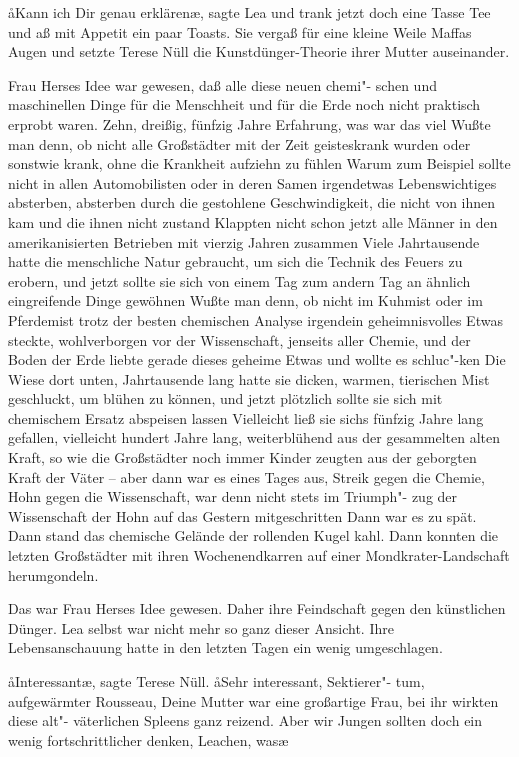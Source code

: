 \aa{}Kann ich Dir genau erklären\ae{}, sagte Lea und trank jetzt doch
eine Tasse Tee und aß mit Appetit ein paar Toasts. Sie
vergaß für eine kleine Weile Maffas Augen und setzte Terese
Nüll die Kunstdünger-Theorie ihrer Mutter auseinander.

Frau Herses Idee war gewesen, daß alle diese neuen chemi"-%
schen und maschinellen Dinge für die Menschheit und für die
Erde noch nicht praktisch erprobt waren. Zehn, dreißig, fünfzig
Jahre Erfahrung, was war das viel\frag{} Wußte man denn, ob
nicht alle Großstädter mit der Zeit geisteskrank wurden oder
sonstwie krank, ohne die Krankheit aufziehn zu fühlen\frag{}
Warum zum Beispiel sollte nicht in allen Automobilisten oder
in deren Samen irgendetwas Lebenswichtiges absterben,
absterben durch die gestohlene Geschwindigkeit, die nicht von
ihnen kam und die ihnen nicht zustand\frag{} Klappten nicht schon
jetzt alle Männer in den amerikanisierten Betrieben mit
vierzig Jahren zusammen\frag{} Viele Jahrtausende hatte die
menschliche Natur gebraucht, um sich die Technik des Feuers
zu erobern, und jetzt sollte sie sich von einem Tag zum andern
Tag an ähnlich eingreifende Dinge gewöhnen\frag{} Wußte man
denn, ob nicht im Kuhmist oder im Pferdemist trotz der besten
chemischen Analyse irgendein geheimnisvolles Etwas steckte,
wohlverborgen vor der Wissenschaft, jenseits aller Chemie,
und der Boden der Erde liebte gerade dieses geheime Etwas
und wollte es schluc"-ken\frag{} Die Wiese dort unten, Jahrtausende
lang hatte sie dicken, warmen, tierischen Mist geschluckt, um
blühen zu können, und jetzt plötzlich sollte sie sich mit chemischem
Ersatz abspeisen lassen\frag{} Vielleicht ließ sie sichs fünfzig Jahre
lang gefallen, vielleicht hundert Jahre lang, weiterblühend
aus der gesammelten alten Kraft, so wie die Großstädter noch
immer Kinder zeugten aus der geborgten Kraft der Väter --
aber dann war es eines Tages aus, Streik gegen die Chemie,
Hohn gegen die Wissenschaft, war denn nicht stets im Triumph"-%
zug der Wissenschaft der Hohn auf das Gestern mitgeschritten\frag{}
Dann war es zu spät. Dann stand das chemische Gelände der
rollenden Kugel kahl. Dann konnten die letzten Großstädter
mit ihren Wochenendkarren auf einer Mondkrater-Landschaft
herumgondeln.

Das war Frau Herses Idee gewesen. Daher ihre Feindschaft
gegen den künstlichen Dünger. Lea selbst war nicht mehr so
ganz dieser Ansicht. Ihre Lebensanschauung hatte in den
letzten Tagen ein wenig umgeschlagen.

\aa{}Interessant\ae{}, sagte Terese Nüll. \aa{}Sehr interessant, Sektierer"-%
tum, aufgewärmter Rousseau, Deine
Mutter war eine großartige Frau, bei ihr wirkten diese alt"-%
väterlichen Spleens ganz reizend. Aber wir Jungen sollten
doch ein wenig fortschrittlicher denken, Leachen, was\frag{}\ae{}

